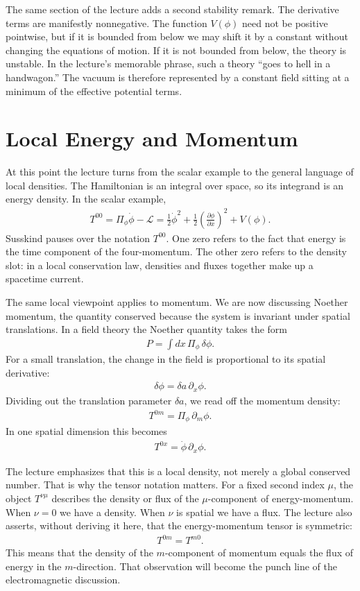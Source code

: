 The same section of the lecture adds a second stability remark. The derivative terms are manifestly nonnegative. The function \(V(\phi)\) need not be positive pointwise, but if it is bounded from below we may shift it by a constant without changing the equations of motion. If it is not bounded from below, the theory is unstable. In the lecture's memorable phrase, such a theory ``goes to hell in a handwagon.'' The vacuum is therefore represented by a constant field sitting at a minimum of the effective potential terms.

\section{Local Energy and Momentum}

At this point the lecture turns from the scalar example to the general language of local densities. The Hamiltonian is an integral over space, so its integrand is an energy density. In the scalar example,
\begin{align}
T^{00}=\Pi_\phi\dot\phi-\mathcal L
=\frac12\dot\phi^2+\frac12\left(\frac{\partial\phi}{\partial x}\right)^2+V(\phi).
\end{align}
Susskind pauses over the notation \(T^{00}\). One zero refers to the fact that energy is the time component of the four-momentum. The other zero refers to the density slot: in a local conservation law, densities and fluxes together make up a spacetime current.

The same local viewpoint applies to momentum. We are now discussing Noether momentum, the quantity conserved because the system is invariant under spatial translations. In a field theory the Noether quantity takes the form
\begin{align}
P=\int dx\,\Pi_\phi\,\delta\phi.
\end{align}
For a small translation, the change in the field is proportional to its spatial derivative:
\begin{align}
\delta\phi = \delta a\,\partial_x\phi.
\end{align}
Dividing out the translation parameter \(\delta a\), we read off the momentum density:
\begin{align}
T^{0m}=\Pi_\phi\,\partial_m\phi.
\end{align}
In one spatial dimension this becomes
\begin{align}
T^{0x}=\dot\phi\,\partial_x\phi.
\end{align}

The lecture emphasizes that this is a local density, not merely a global conserved number. That is why the tensor notation matters. For a fixed second index \(\mu\), the object \(T^{\nu\mu}\) describes the density or flux of the \(\mu\)-component of energy-momentum. When \(\nu=0\) we have a density. When \(\nu\) is spatial we have a flux. The lecture also asserts, without deriving it here, that the energy-momentum tensor is symmetric:
\begin{align}
T^{0m}=T^{m0}.
\end{align}
This means that the density of the \(m\)-component of momentum equals the flux of energy in the \(m\)-direction. That observation will become the punch line of the electromagnetic discussion.

